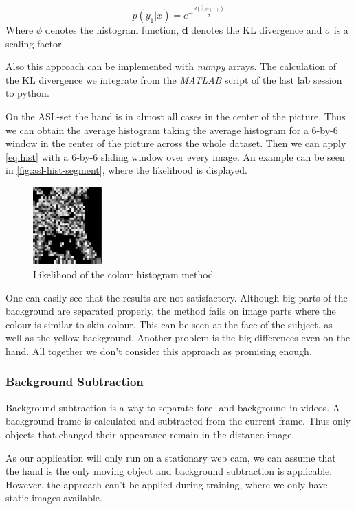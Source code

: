\documentclass[letterpaper, 10 pt, conference]{ieeeconf}  %
\begin{document}
\begin{equation}
p(y_1 | x) = e^{-\frac{d(\bar{\phi},\phi(x))}{\sigma}}
\label{eq:hist}
\end{equation}
Where $\phi$ denotes the histogram function, \textbf{d} denotes the KL divergence and $\sigma$ is a scaling factor.

Also this approach can be implemented with \textit{numpy} arrays. The calculation of the KL divergence we integrate from the \textit{MATLAB} script of the last lab session to python.

On the ASL-set the hand is in almost all cases in the center of the picture. Thus we can obtain the average histogram taking the average histogram for a 6-by-6 window in the center of the picture across the whole dataset. Then we can apply \autoref{eq:hist} with a 6-by-6 sliding window over every image. An example can be seen in \autoref{fig:asl-hist-segment}, where the likelihood is displayed.

\begin{figure}
		\centering
		\includegraphics[height=3cm]{asl-hist-segment}
		\caption{Likelihood of the colour histogram method}
		\label{fig:asl-hist-segment}
\end{figure}
One can easily see that the results are not satisfactory. Although big parts of the background are separated properly, the method fails on image parts where the colour is similar to skin colour. This can be seen at the face of the subject, as well as the yellow background. Another problem is the big differences even on the hand. All together we don't consider this approach as promising enough.

\subsubsection{Background Subtraction}

Background subtraction is a way to separate fore- and background in videos. A background frame is calculated and subtracted from the current frame. Thus only objects that changed their appearance remain in the distance image.

As our application will only run on a stationary web cam, we can assume that the hand is the only moving object and background subtraction is applicable. However, the approach can't be applied during training, where we only have static images available.
\end{document}
